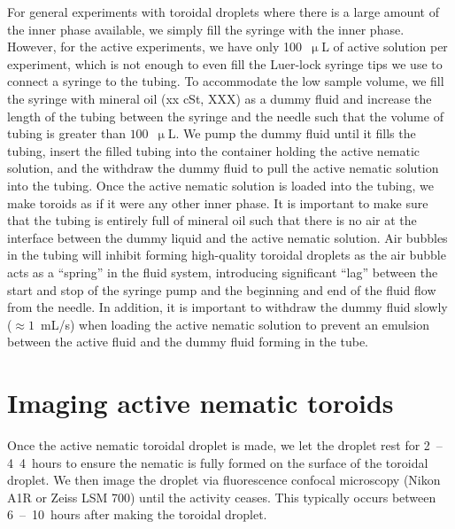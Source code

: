 For general experiments with toroidal droplets where there is a large amount of the inner phase available, we simply fill the syringe with the inner phase.
However, for the active experiments, we have only 100~$\upmu$L of active solution per experiment, which is not enough to even fill the Luer-lock syringe tips we use to connect a syringe to the tubing.
To accommodate the low sample volume, we fill the syringe with mineral oil (xx cSt, XXX) as a dummy fluid and increase the length of the tubing between the syringe and the needle such that the volume of tubing is greater than $100$~$\upmu$L.
We pump the dummy fluid until it fills the tubing, insert the filled tubing into the container holding the active nematic solution, and the withdraw the dummy fluid to pull the active nematic solution into the tubing.
Once the active nematic solution is loaded into the tubing, we make toroids as if it were any other inner phase.
It is important to make sure that the tubing is entirely full of mineral oil such that there is no air at the interface between the dummy liquid and the active nematic solution.
Air bubbles in the tubing will inhibit forming high-quality toroidal droplets as the air bubble acts as a ``spring'' in the fluid system, introducing significant ``lag'' between the start and stop of the syringe pump and the beginning and end of the fluid flow from the needle.
In addition, it is important to withdraw the dummy fluid slowly ($\approx 1$~mL/s) when loading the active nematic solution to prevent an emulsion between the active fluid and the dummy fluid forming in the tube.\\




\section{Imaging active nematic toroids}
Once the active nematic toroidal droplet is made, we let the droplet rest for 2~--4~4~hours to ensure the nematic is fully formed on the surface of the toroidal droplet.
We then image the droplet via fluorescence confocal microscopy (Nikon A1R or Zeiss LSM 700) until the activity ceases.
This typically occurs between 6~--~10~hours after making the toroidal droplet.


